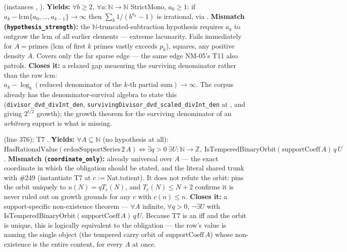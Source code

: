 \begin{obs} 
 (instances
,
).
\textbf{Yields:} $\forall b\ge2,\ \forall a:\mathbb N\to\mathbb N$ StrictMono, $a_0\ge1$: if
$a_k - \mathrm{lcm}\{a_0,\dots,a_{k-1}\}\to\infty$ then $\sum_k 1/(b^{a_k}-1)$ is irrational, via
.
\textbf{Mismatch (\texttt{hypothesis\_strength}):} the $\mathbb N$-truncated-subtraction
hypothesis requires $a_k$ to outgrow the lcm of all earlier elements — extreme lacunarity. Fails
immediately for $A=$primes (lcm of first $k$ primes vastly exceeds $p_k$), squares, any positive
density $A$. Covers only the far sparse edge — the same edge NM-05's T11 also patrols.
\textbf{Closes it:} a relaxed gap measuring the surviving denominator rather than the raw lcm:
$a_k - \log_b(\text{reduced denominator of the }k\text{-th partial sum}) \to \infty$. The corpus
already has the denominator-survival algebra to state this
(\texttt{divisor\_dvd\_divInt\_den}, \texttt{survivingDivisor\_dvd\_scaled\_divInt\_den} at
, and
 giving
$2^{t/2}$ growth); the growth theorem for the surviving denominator of an \emph{arbitrary}
support is what is missing.
\end{obs}

\begin{obs} 
(line 376); T7 .
\textbf{Yields:} $\forall A\subseteq\mathbb N$ (no hypothesis at all):
$\mathrm{HasRationalValue}(\mathrm{erdosSupportSeries}\,2\,A) \Leftrightarrow \exists q{>}0\
\exists U:\mathbb N\to\mathbb Z,\ \mathrm{IsTemperedBinaryOrbit}(\mathrm{supportCoeff}\,A)\,q\,U$.
\textbf{Mismatch (\texttt{coordinate\_only}):} already universal over $A$ — the exact coordinate
in which the obligation should be stated, and the literal shared trunk with \#249 (instantiate T7
at $c:=\mathrm{Nat.totient}$). It does not refute the orbit:
 pins the orbit
uniquely to $u(N)=qT_c(N)$, and $T_c(N)\le N{+}2$ confirms it is never ruled out on growth
grounds for any $c$ with $c(n)\le n$.
\textbf{Closes it:} a support-specific non-existence theorem — $\forall A$ infinite, $\forall
q{>}0$, $\neg\exists U$ with $\mathrm{IsTemperedBinaryOrbit}(\mathrm{supportCoeff}\,A)\,q\,U$.
Because T7 is an iff and the orbit is unique, this is logically equivalent to the obligation —
the row's value is naming the single object (the tempered carry orbit of $\mathrm{supportCoeff}\,A$)
whose non-existence is the entire content, for every $A$ at once.
\end{obs}

